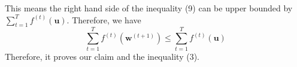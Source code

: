 \documentclass[11pt]{article}
\begin{document}
This means the right hand side of the inequality (9) can be upper bounded by $\sum^{T}_{t=1} f^{(t)}(\bm{u})$. Therefore, we have
\begin{equation}
    \sum_{t=1}^{T} f^{(t)}(\bm{w}^{(t+1)}) \leq \sum^{T}_{t=1} f^{(t)}(\bm{u})
\end{equation}
Therefore, it proves our claim and the inequality (3). 







{


}


\end{document}
